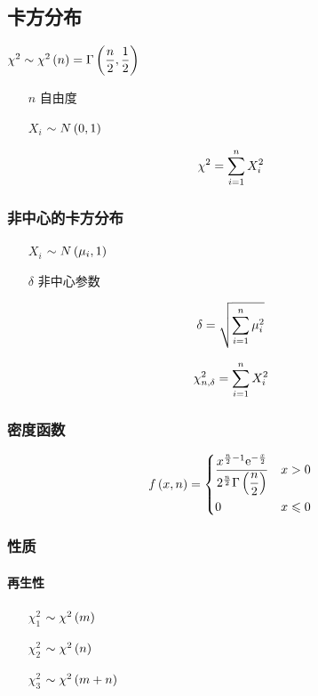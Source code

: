 \documentclass{article}
\begin{document}
\subsection{卡方分布}

$\chi^2\sim\chi^2\left(n\right)=\Gamma\left(\dfrac n2,\dfrac12\right)$

\begin{enumerate}
    \item [$n$] 自由度
    \item [$X_i$] $\sim N\left(0,1\right)$
\end{enumerate}

\[\chi^2=\sum_{i=1}^n X_i^2\]

\subsubsection{非中心的卡方分布}

\begin{enumerate}
    \item [$X_i$] $\sim N\left(\mu_i,1\right)$
    \item [$\delta$] 非中心参数
\end{enumerate}

\[\delta=\sqrt{\sum_{i=1}^n\mu_i^2}\]

\[\chi_{n,\delta}^2=\sum_{i=1}^n X_i^2\]

\subsubsection{密度函数}

\[f\left(x,n\right)=
    \left\{\begin{aligned}
         & \frac{x^{\frac n2-1}\mathrm e^{-\frac x2}}{2^{\frac n2}\Gamma\left(\dfrac n2\right)} &  & x>0         \\
         & 0                                                                    &  & x\leqslant0
    \end{aligned}\right.\]

\subsubsection{性质}

\paragraph{再生性}

\begin{enumerate}
    \item [$\chi_1^2$] $\sim\chi^2\left(m\right)$
    \item [$\chi_2^2$] $\sim\chi^2\left(n\right)$
    \item [$\chi_3^2$] $\sim\chi^2\left(m+n\right)$
\end{enumerate}
\end{document}
